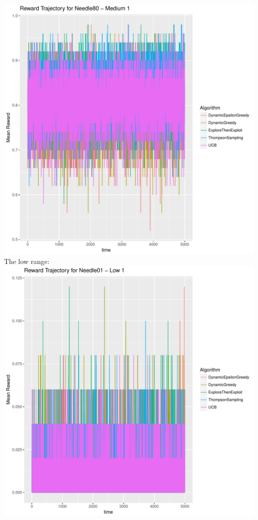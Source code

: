 \documentclass[11pt,letterpaper]{article}
\begin{document}
\includegraphics[scale=0.5]{"../results/Reward Trajectory for Needle80 - Medium 1"}
\\
The low range: \\
\includegraphics[scale=0.5]{"../results/Reward Trajectory for Needle01 - Low 1"} \\
\end{document}
